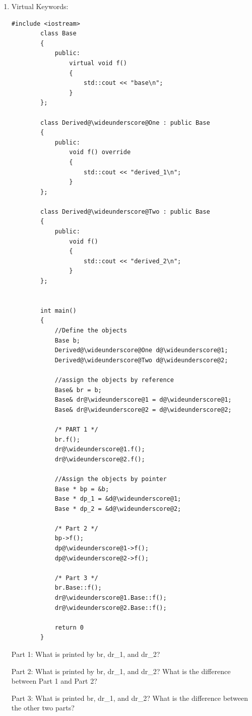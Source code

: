 \documentclass{article}
\begin{document}
\begin{enumerate}[label=(\alph*), itemsep = 120pt]
\begin{lstlisting}[style = CStyle]
        free(gabriel@\wideunderscore@company);
    \end{lstlisting}

    Whenever the above code is executed, a memory leak occurs. \textbf{Explain what a memory leak is and come up with one line of code that can be added above to fix the memory leak.}

    \item Virtual Keywords:
    \begin{lstlisting}[style = CStyle]
        #include <iostream>
        class Base
        {
            public: 
                virtual void f()
                {
                    std::cout << "base\n";
                }
        };

        class Derived@\wideunderscore@One : public Base
        {
            public:
                void f() override
                {
                    std::cout << "derived_1\n";
                }
        };

        class Derived@\wideunderscore@Two : public Base 
        {
            public: 
                void f()
                {
                    std::cout << "derived_2\n";
                }
        };

    
        int main()
        {
            //Define the objects
            Base b;
            Derived@\wideunderscore@One d@\wideunderscore@1;
            Derived@\wideunderscore@Two d@\wideunderscore@2;

            //assign the objects by reference
            Base& br = b;
            Base& dr@\wideunderscore@1 = d@\wideunderscore@1;
            Base& dr@\wideunderscore@2 = d@\wideunderscore@2;

            /* PART 1 */
            br.f();
            dr@\wideunderscore@1.f();
            dr@\wideunderscore@2.f();

            //Assign the objects by pointer
            Base * bp = &b;
            Base * dp_1 = &d@\wideunderscore@1;
            Base * dp_2 = &d@\wideunderscore@2;

            /* Part 2 */
            bp->f();
            dp@\wideunderscore@1->f();
            dp@\wideunderscore@2->f();

            /* Part 3 */
            br.Base::f();
            dr@\wideunderscore@1.Base::f();
            dr@\wideunderscore@2.Base::f();

            return 0
        }
    \end{lstlisting}
    Part 1:
    What is printed by br, dr\_1, and dr\_2?

    \vspace{2cm}
    Part 2:
    What is printed by br, dr\_1, and dr\_2? What is the difference between Part 1 and Part 2?

    \vspace{2cm}
    Part 3:
    What is printed br, dr\_1, and dr\_2? What is the difference between the other two parts?
    \vspace{2cm}
    
    \end{enumerate}


    
\end{document}
